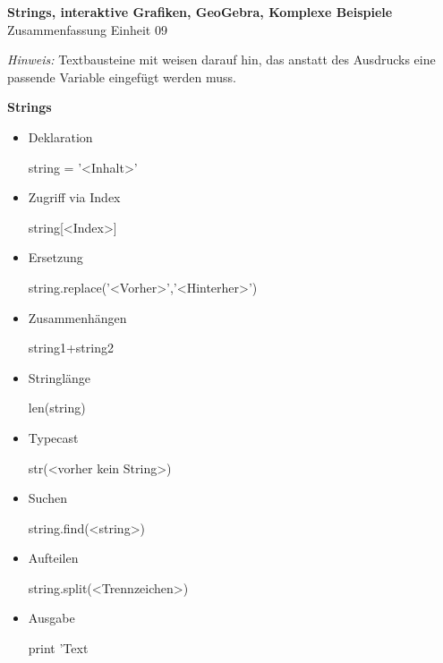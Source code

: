 \documentclass[a4paper,9pt,DIV15,twocolumn]{scrartcl}
\begin{document}
\begin{center}
    \textbf{\LARGE Strings, interaktive Grafiken, GeoGebra, Komplexe Beispiele}\\
    {\large Zusammenfassung Einheit 09}
\end{center}
\textsl{Hinweis:} Textbausteine mit  weisen darauf hin, das anstatt des Ausdrucks eine passende Variable eingefügt werden muss.

\medskip

\textbf{Strings}

\begin{itemize}
 \item Deklaration
\begin{sagein}
string = '<Inhalt>'
\end{sagein}
\item Zugriff via Index
\begin{sagein}
string[<Index>]
\end{sagein}
\item Ersetzung
\begin{sagein}
string.replace('<Vorher>','<Hinterher>')
\end{sagein}
\item Zusammenhängen
\begin{sagein}
 string1+string2
\end{sagein}
\item Stringlänge
\begin{sagein}
 len(string)
\end{sagein}
\item Typecast
\begin{sagein}
str(<vorher kein String>)
\end{sagein}
\item Suchen
\begin{sagein}
 string.find(<string>)
\end{sagein}
\item Aufteilen
\begin{sagein}
 string.split(<Trennzeichen>)
\end{sagein}
\item Ausgabe
\begin{sagein}
  print 'Text %
 \end{sagein}
\end{itemize}
\end{document}
